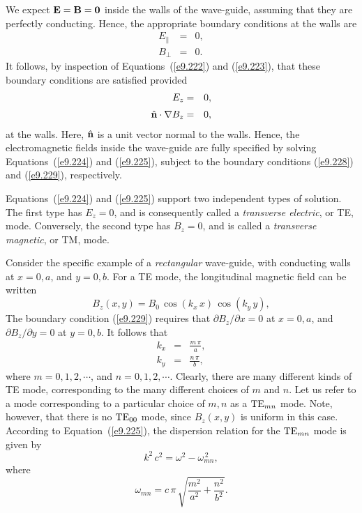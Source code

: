 We expect ${\bf E} = {\bf B} = {\bf 0}$ inside the walls of the wave-guide,
assuming that they are perfectly conducting. Hence, the appropriate
boundary conditions at the walls are
\begin{eqnarray}
E_{\parallel} &=& 0,\\[0.5ex]
B_{\perp} &=& 0.
\end{eqnarray}
It follows, by inspection of Equations~(\ref{e9.222}) and (\ref{e9.223}), that
these boundary conditions are  satisfied provided
\begin{eqnarray}\label{e9.228}
E_z &=& 0,\\[0.5ex]\label{e9.229}
\hat{\bf n}\cdot\nabla B_z &=& 0,
\end{eqnarray}
at the walls. Here, $\hat{\bf n}$ is a unit vector normal to the walls.
Hence, the electromagnetic fields inside the wave-guide are fully
specified by solving Equations~(\ref{e9.224}) and (\ref{e9.225}), subject to
the boundary conditions (\ref{e9.228}) and (\ref{e9.229}), respectively.

Equations~(\ref{e9.224}) and (\ref{e9.225}) support two independent types
of solution. The first type has $E_z=0$, and is consequently called a {\em transverse electric}, or TE,  mode. Conversely, the
second type  has $B_z=0$, and is called a {\em transverse
magnetic}, or TM, mode.

	Consider the specific example of a {\em rectangular}\/ wave-guide, with conducting walls
at $x=0, a$,  and $y=0, b$. For a TE mode, the longitudinal
magnetic field can be written
\begin{equation}
B_z(x,y) = B_0\,\cos(k_x\,x)\,\cos(k_y\,y),
\end{equation}
The boundary condition (\ref{e9.229}) requires that
$\partial B_z/\partial x =0$ at $x=0, a$, and $\partial B_z/\partial y=0$
at $y=0, b$. It follows that
\begin{eqnarray}
k_x &=& \frac{m\,\pi}{a},\\[0.5ex]
k_y&=& \frac{n\,\pi}{b},
\end{eqnarray}
where $m=0, 1, 2, \cdots$, and $n=0, 1, 2, \cdots$. Clearly, there are
many different kinds of TE mode, corresponding to the many different
choices of $m$ and $n$. Let us refer to a mode corresponding to
a particular choice of $m, n$ as a ${\rm TE}_{mn}$ mode. Note, however, that there
is no ${\rm TE}_{00}$ mode, since $B_z(x,y)$ is uniform in this case.
 According to
Equation~(\ref{e9.225}), the dispersion relation for the ${\rm TE}_{mn}$ mode is
given by
\begin{equation}\label{e9.233}
k^2\,c^2 = \omega^2 - \omega_{mn}^{\,2},
\end{equation}
where
\begin{equation}\label{e9.234}
\omega_{mn} = c\,\pi\,\sqrt{\frac{m^2}{a^2} + \frac{n^2}{b^2}}.
\end{equation}


